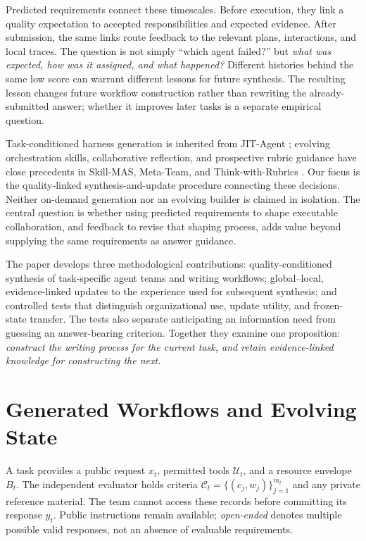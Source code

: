 \documentclass[11pt]{article}
\newcommand{\crit}{\mathcal{C}}
\begin{document}
Predicted requirements connect these timescales. Before execution, they link a quality expectation to accepted responsibilities and expected evidence. After submission, the same links route feedback to the relevant plans, interactions, and local traces. The question is not simply ``which agent failed?'' but \emph{what was expected, how was it assigned, and what happened?} Different histories behind the same low score can warrant different lessons for future synthesis. The resulting lesson changes future workflow construction rather than rewriting the already-submitted answer; whether it improves later tasks is a separate empirical question.

Task-conditioned harness generation is inherited from JIT-Agent \citep{zhang2026jit}; evolving orchestration skills, collaborative reflection, and prospective rubric guidance have close precedents in Skill-MAS, Meta-Team, and Think-with-Rubrics \citep{lin2026skillmas,hao2026metateam,yu2026thinkrubrics}. Our focus is the quality-linked synthesis-and-update procedure connecting these decisions. Neither on-demand generation nor an evolving builder is claimed in isolation. The central question is whether using predicted requirements to shape executable collaboration, and feedback to revise that shaping process, adds value beyond supplying the same requirements as answer guidance.

The paper develops three methodological contributions: quality-conditioned synthesis of task-specific agent teams and writing workflows; global--local, evidence-linked updates to the experience used for subsequent synthesis; and controlled tests that distinguish organizational use, update utility, and frozen-state transfer. The tests also separate anticipating an information need from guessing an answer-bearing criterion. Together they examine one proposition: \emph{construct the writing process for the current task, and retain evidence-linked knowledge for constructing the next.}

\section{Generated Workflows and Evolving State}
\label{sec:setting}

A task provides a public request $x_t$, permitted tools $\mathcal U_t$, and a resource envelope $B_t$. The independent evaluator holds criteria $\crit_t=\{(c_j,w_j)\}_{j=1}^{m_t}$ and any private reference material. The team cannot access these records before committing its response $y_t$. Public instructions remain available; \emph{open-ended} denotes multiple possible valid responses, not an absence of evaluable requirements.
\end{document}
